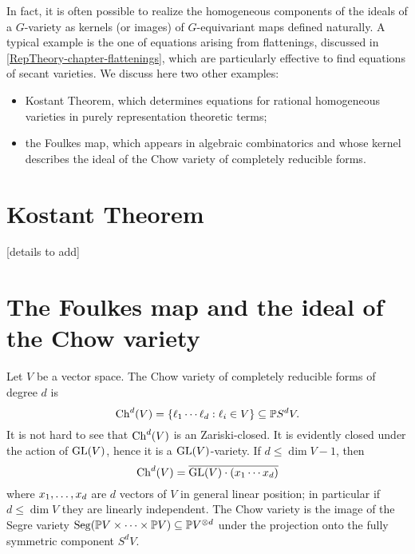 In fact, it is often possible to realize the homogeneous components of the ideals of a $G$-variety as kernels (or images) of $G$-equivariant maps defined naturally.  A typical example is the one of equations arising from flattenings, discussed in \ref{RepTheory-chapter-flattenings}, which are particularly effective to find equations of secant varieties. We discuss here two other examples:
\begin{itemize}
 \item Kostant Theorem, which determines equations for rational homogeneous varieties in purely representation theoretic terms;
 \item the Foulkes map, which appears in algebraic combinatorics and whose kernel describes the ideal of the Chow variety of completely reducible forms.
\end{itemize}

\section{Kostant Theorem}
\label{RepTheory-section-kostant}

[details to add]

\section{The Foulkes map and the ideal of the Chow variety}
\label{RepTheory-section-foulkes}

Let $V$ be a vector space. The Chow variety of completely reducible forms of degree $d$ is 
\[
\mathrm{Ch}^{d}(V) = \{ \ell_1 \cdots \ell_d : \ell_i \in V \} \subseteq \mathbb{P} S^d V.
\]
It is not hard to see that $\mathrm{Ch}^d(V)$ is an Zariski-closed. It is evidently closed under the action of $\mathrm{GL}(V)$, hence it is a $\mathrm{GL}(V)$-variety. If $d \leq \dim V -1$, then 
\[
\mathrm{Ch}^d(V) = \overline{\mathrm{GL}(V) \cdot (x_1 \cdots x_d)}
\]
where $x_1 , \ldots , x_d$ are $d$ vectors of $V$ in general linear position; in particular if $d\leq \dim V$ they are linearly independent. The Chow variety is the image of the Segre variety $\mathrm{Seg}(\mathbb{P} V \times \cdots \times \mathbb{P} V) \subseteq \mathbb{P} V^{\otimes d}$ under the projection onto the fully symmetric component $S^d V$.

